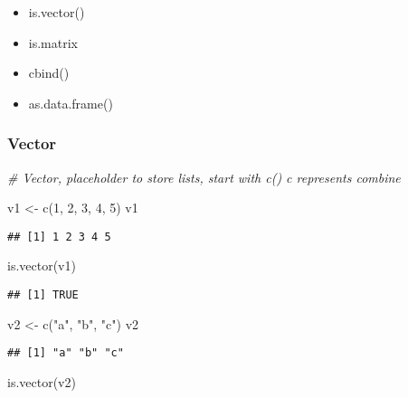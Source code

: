 \documentclass[
]{article}
\newenvironment{Shaded}{\begin{snugshade}}{\end{snugshade}}
\newcommand{\CommentTok}[1]{\textcolor[rgb]{0.56,0.35,0.01}{\textit{#1}}}
\newcommand{\DecValTok}[1]{\textcolor[rgb]{0.00,0.00,0.81}{#1}}
\newcommand{\FunctionTok}[1]{\textcolor[rgb]{0.00,0.00,0.00}{#1}}
\newcommand{\NormalTok}[1]{#1}
\newcommand{\OtherTok}[1]{\textcolor[rgb]{0.56,0.35,0.01}{#1}}
\newcommand{\StringTok}[1]{\textcolor[rgb]{0.31,0.60,0.02}{#1}}
\providecommand{\tightlist}{%
  \setlength{\itemsep}{0pt}\setlength{\parskip}{0pt}}
\begin{document}
\begin{itemize}
\tightlist
\item
  is.vector()
\item
  is.matrix
\item
  cbind()
\item
  as.data.frame()
\end{itemize}

\hypertarget{vector}{%
\subsubsection{Vector}\label{vector}}

\begin{Shaded}
\begin{Highlighting}[]
\CommentTok{\# Vector, placeholder to store lists, start with c() c represents combine}

\NormalTok{v1 }\OtherTok{\textless{}{-}} \FunctionTok{c}\NormalTok{(}\DecValTok{1}\NormalTok{, }\DecValTok{2}\NormalTok{, }\DecValTok{3}\NormalTok{, }\DecValTok{4}\NormalTok{, }\DecValTok{5}\NormalTok{)}
\NormalTok{v1}
\end{Highlighting}
\end{Shaded}

\begin{verbatim}
## [1] 1 2 3 4 5
\end{verbatim}

\begin{Shaded}
\begin{Highlighting}[]
\FunctionTok{is.vector}\NormalTok{(v1)}
\end{Highlighting}
\end{Shaded}

\begin{verbatim}
## [1] TRUE
\end{verbatim}

\begin{Shaded}
\begin{Highlighting}[]
\NormalTok{v2 }\OtherTok{\textless{}{-}} \FunctionTok{c}\NormalTok{(}\StringTok{"a"}\NormalTok{, }\StringTok{"b"}\NormalTok{, }\StringTok{"c"}\NormalTok{)}
\NormalTok{v2}
\end{Highlighting}
\end{Shaded}

\begin{verbatim}
## [1] "a" "b" "c"
\end{verbatim}

\begin{Shaded}
\begin{Highlighting}[]
\FunctionTok{is.vector}\NormalTok{(v2)}
\end{Highlighting}
\end{Shaded}
\end{document}
